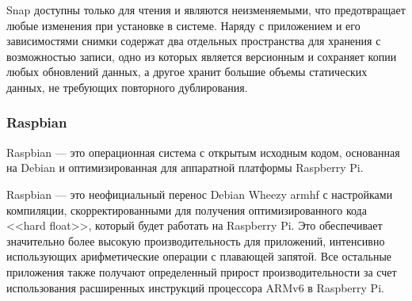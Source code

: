 Snap доступны только для чтения и являются неизменяемыми, что предотвращает любые изменения при установке в системе. Наряду с приложением и его зависимостями снимки содержат два отдельных пространства для хранения с возможностью записи, одно из которых является версионным и сохраняет копии любых обновлений данных, а другое хранит большие объемы статических данных, не требующих повторного дублирования.



\subsubsection{Raspbian}

Raspbian \cite{Raspbian_overview} --- это операционная система с открытым исходным кодом, основанная на Debian и оптимизированная для аппаратной платформы Raspberry Pi.

Raspbian --- это неофициальный перенос Debian Wheezy armhf \cite{Debian_Wheezy} с настройками компиляции, скорректированными для получения оптимизированного кода <<hard float>>, который будет работать на Raspberry Pi. Это обеспечивает значительно более высокую производительность для приложений, интенсивно использующих арифметические операции с плавающей запятой. Все остальные приложения также получают определенный прирост производительности за счет использования расширенных инструкций процессора ARMv6 в Raspberry Pi.

